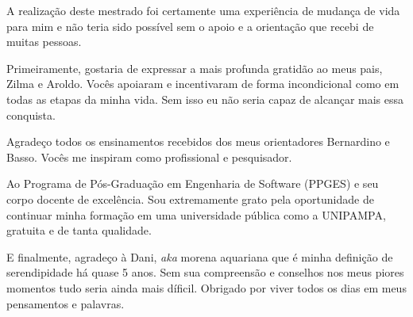 \begin{agradecimentos}
\linebreak
A realização deste mestrado foi certamente uma experiência de mudança de vida para mim e não teria sido possível sem o apoio e a orientação que recebi de muitas pessoas.

Primeiramente, gostaria de expressar a mais profunda gratidão ao meus pais, Zilma e Aroldo. Vocês apoiaram e incentivaram de forma incondicional como em todas as etapas da minha vida. Sem isso eu não seria capaz de alcançar mais essa conquista.

Agradeço todos os ensinamentos recebidos dos meus orientadores Bernardino e Basso. Vocês me inspiram como profissional e pesquisador.

Ao Programa de Pós-Graduação em Engenharia de Software (PPGES) e seu corpo docente de excelência. 
Sou extremamente grato pela oportunidade de continuar minha formação em uma universidade pública como a UNIPAMPA, gratuita e de tanta qualidade.

E finalmente, agradeço à Dani, \textit{aka} morena aquariana que é minha definição de serendipidade há quase 5 anos. 
Sem sua compreensão e conselhos nos meus piores momentos tudo seria ainda mais díficil.
Obrigado por viver todos os dias em meus pensamentos e palavras.

\end{agradecimentos}